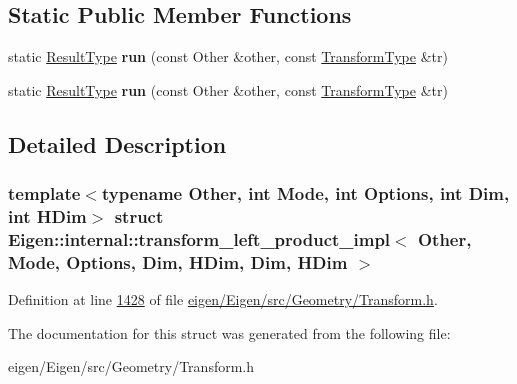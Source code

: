 \subsection*{Static Public Member Functions}
\begin{DoxyCompactItemize}
\item 
\mbox{\label{struct_eigen_1_1internal_1_1transform__left__product__impl_3_01_other_00_01_mode_00_01_options_037bfaa634250d504931892f5ae22fc66_acae024acd94f3b4485b264fc6ea0dc9d}} 
static \hyperlink{group___geometry___module_class_eigen_1_1_transform}{Result\+Type} {\bfseries run} (const Other \&other, const \hyperlink{group___geometry___module_class_eigen_1_1_transform}{Transform\+Type} \&tr)
\item 
\mbox{\label{struct_eigen_1_1internal_1_1transform__left__product__impl_3_01_other_00_01_mode_00_01_options_037bfaa634250d504931892f5ae22fc66_acae024acd94f3b4485b264fc6ea0dc9d}} 
static \hyperlink{group___geometry___module_class_eigen_1_1_transform}{Result\+Type} {\bfseries run} (const Other \&other, const \hyperlink{group___geometry___module_class_eigen_1_1_transform}{Transform\+Type} \&tr)
\end{DoxyCompactItemize}


\subsection{Detailed Description}
\subsubsection*{template$<$typename Other, int Mode, int Options, int Dim, int H\+Dim$>$\newline
struct Eigen\+::internal\+::transform\+\_\+left\+\_\+product\+\_\+impl$<$ Other, Mode, Options, Dim, H\+Dim, Dim, H\+Dim $>$}



Definition at line \hyperlink{eigen_2_eigen_2src_2_geometry_2_transform_8h_source_l01428}{1428} of file \hyperlink{eigen_2_eigen_2src_2_geometry_2_transform_8h_source}{eigen/\+Eigen/src/\+Geometry/\+Transform.\+h}.



The documentation for this struct was generated from the following file\+:\begin{DoxyCompactItemize}
\item 
eigen/\+Eigen/src/\+Geometry/\+Transform.\+h\end{DoxyCompactItemize}
